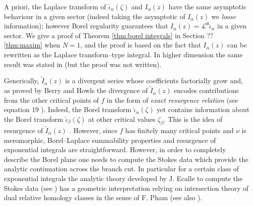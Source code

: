 \documentclass[11pt,a4paper,twoside,leqno,noamsfonts]{amsart}
\numberwithin{equation}{section}
\begin{document}
\begin{itemize}
A priori, the Laplace transform of $\hat{\iota}_\alpha(\zeta)$ and $I_{\alpha}(z)$ have the same asymptotic behaviour in a given sector (indeed taking the asymptotic of $I_\alpha(z)$ we \textit{loose} information); however Borel regularity guarantees that $I_{\alpha}(z)=\mathcal{L}^{\theta}\hat{\iota}_{\alpha}$ in a given sector. We give a proof of Theorem \ref{thm:borel integrals} in Section ?? \ref{thm:maxim} when $N=1$, and the proof is based on the fact that $I_\alpha(z)$ can be rewritten as the Laplace transform--type integral. In higher dimension the same result was stated in \cite{Dunne-Unsal 15} (but the proof was not written).

Generically, $\tilde{I}_{\alpha}(z)$ is a divergent series whose coefficients factorially grow and, as proved by Berry and Howls \cite{BH}\cite{H} the divergence of $\tilde{I}_{\alpha}(z)$ encodes contributions from the other critical points of $f$ in the form of \textit{exact resurgence relation} (see equation 19 \cite{BH}). Indeed, the Borel transform $\hat{\iota}_\alpha(\zeta)$ yet contains information about the Borel transform $\hat{\iota}_{\beta}(\zeta)$ at other critical values $\zeta_\beta$. This is the idea of resurgence of $\tilde{I}_{\alpha}(z)$ \cite{EcalleI}\cite{EcalleII}\cite{EcalleIII}. However, since $f$ has finitely many critical points and $\nu$ is meromorphic, Borel--Laplace summability properties and resurgence of exponential integrals are straightforward. However, in order to completely describe the Borel plane one needs to compute the Stokes data which provide the analytic continuation across the branch cut. In particular for a certain class of exponential integrals the analytic theory developed by J. Ecalle to compute the Stokes data (see \cite{Ecalle}\cite{diverg-resurg-i}\cite{Dorigoni}\cite{Schiappa}) has a geometric interpretation relying on intersection theory of dual relative homology classes in the sense of F. Pham \cite{pham} (see also \cite{Maxim_lectures}\cite{Maxim_slide_ERC}).   
\end{itemize}
\end{document}
